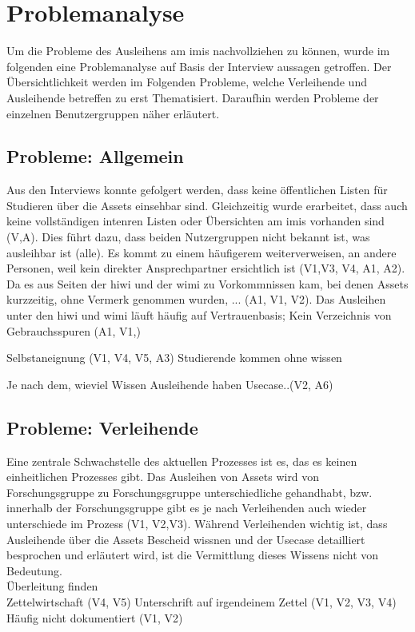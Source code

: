 

\section{Problemanalyse}
\label{section:iststand}
        
Um die Probleme des Ausleihens am \ac{imis} nachvollziehen zu können, wurde im folgenden eine
Problemanalyse auf Basis der Interview aussagen getroffen. 
Der Übersichtlichkeit werden im Folgenden Probleme, welche Verleihende und Ausleihende betreffen zu
erst Thematisiert. Daraufhin werden Probleme der einzelnen Benutzergruppen näher erläutert.

\subsection*{Probleme: Allgemein}
Aus den Interviews konnte gefolgert werden, dass keine öffentlichen Listen für Studieren über die
Assets einsehbar sind. Gleichzeitig wurde erarbeitet, dass auch keine vollständigen intenren Listen
oder Übersichten am \ac{imis} vorhanden sind (V,A). Dies führt dazu, dass beiden Nutzergruppen nicht
bekannt ist, was ausleihbar ist (alle). Es kommt zu einem häufigerem weiterverweisen, an andere
Personen, weil kein direkter Ansprechpartner ersichtlich ist (V1,V3, V4, A1, A2). Da es aus Seiten
der \ac{hiwi} und der \ac{wimi} zu Vorkommnissen kam, bei denen Assets kurzzeitig, ohne Vermerk
genommen wurden, ... (A1, V1, V2). Das Ausleihen unter den \ac{hiwi} und \ac{wimi} läuft häufig auf
Vertrauenbasis; Kein Verzeichnis von Gebrauchsspuren (A1, V1,)

Selbstaneignung (V1, V4, V5, A3) Studierende kommen ohne wissen 

Je nach dem, wieviel Wissen Ausleihende haben Usecase..(V2, A6)

\subsection*{Probleme: Verleihende}
Eine zentrale Schwachstelle des aktuellen Prozesses ist es, das es keinen einheitlichen Prozesses
gibt. Das Ausleihen von Assets wird von Forschungsgruppe zu Forschungsgruppe unterschiedliche
gehandhabt, bzw. innerhalb der Forschungsgruppe gibt es je nach Verleihenden auch wieder
unterschiede im Prozess (V1, V2,V3). Während Verleihenden wichtig ist, dass Ausleihende über die
Assets Bescheid wissnen und der Usecase detailliert besprochen und erläutert wird, ist die
Vermittlung dieses Wissens nicht von Bedeutung. \\
Überleitung finden\\
Zettelwirtschaft (V4, V5) Unterschrift auf irgendeinem Zettel (V1, V2, V3, V4) Häufig nicht
dokumentiert (V1, V2)

